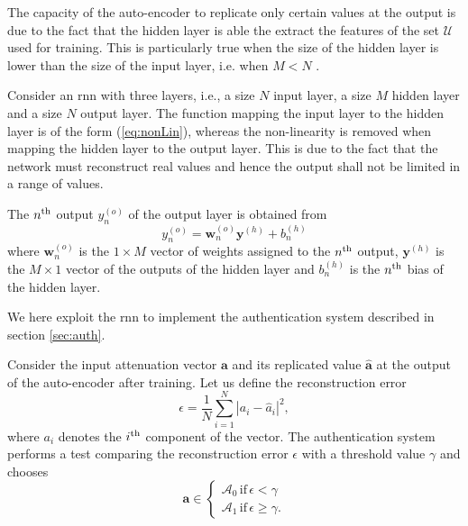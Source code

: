 \documentclass[draftcls,onecolumn,12pt]{IEEEtran}
\begin{document}
The capacity of the auto-encoder to replicate only certain values at the output is due to the fact that the hidden layer is able the extract the features of the set $\mathcal{U}$ used for training. This is particularly true when the size of the hidden layer is lower than the size of the input layer, i.e. when $M<N$ \cite{Bourlard-88}.

Consider an \ac{rnn} with three layers, i.e., a size $N$ input layer, a size $M$ hidden layer and a size $N$ output layer.  The function mapping the input layer to the hidden layer is of the form (\ref{eq:nonLin}), whereas the non-linearity is removed when mapping the hidden layer to the output layer. This is due to the fact that the network must reconstruct real values and hence the output shall not be limited in a range of values. 

The $n^{\rm th}$ output $y_n^{(o)}$ of the output layer is obtained from
\begin{equation}
    y_n^{(o)}= \bm{w}_n^{(o)}\bm{y}^{(h)}+b_n^{(h)}
\end{equation}
where $\bm{w}_n^{(o)}$ is the $1\times M$ vector of weights assigned to the $n^{\rm th}$ output, $\bm{y}^{(h)}$ is the $M\times 1$ vector of the outputs of the hidden layer and $b_n^{(h)}$ is the $n^{\rm th}$ bias of the hidden layer.


We here exploit the \ac{rnn} to implement the authentication system described in section \ref{sec:auth}. 

Consider the input attenuation vector $\bm{a}$ and its replicated value $\hat{\bm{a}}$ at the output of the auto-encoder after training.
Let us define the reconstruction error
\begin{equation}\label{eq: rec err}
    \epsilon = \frac{1}{N}\sum_{i=1}^{N}|a_i-\hat{a}_i|^2,
\end{equation}
where $a_i$ denotes the $i^{\rm th}$ component of the vector. The authentication system performs a test comparing the reconstruction error $\epsilon$ with a threshold value $\gamma$ and chooses 
\begin{equation}
\bm{a} \in
\begin{cases}
\mathcal{A}_0 \, \text{if} \, \epsilon < \gamma \\
\mathcal{A}_1 \, \text{if} \, \epsilon \ge \gamma. 
\end{cases}
\end{equation}
\end{document}
